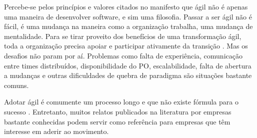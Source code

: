 \documentclass[a4paper,11pt]{article}
\begin{document}
Percebe-se pelos princípios e valores citados no manifesto que ágil não é apenas uma maneira de desenvolver software, e sim uma filosofia. Passar a ser ágil não é fácil, é uma mudança na maneira como a organização trabalha, uma mudança de mentalidade. Para se tirar proveito dos benefícios de uma transformação ágil, toda a organização precisa apoiar e participar ativamente da transição \cite{Kirsi2013}. Mas os desafios não param por aí. Problemas como falta de experiência, comunicação entre times distribuídos, disponibilidade do PO, escalabilidade, falta de abertura a mudanças e  outras dificuldades de quebra de paradigma são situações bastante comuns.

Adotar ágil é comumente um processo longo e que não existe fórmula para o sucesso \cite{Block2011}. Entretanto, muitos relatos publicados na literatura por empresas bastante conhecidas \cite{Adobe2012,Microsoft2013,NHN2012} podem servir como referência para empresas que têm interesse em aderir ao movimento.
\end{document}
